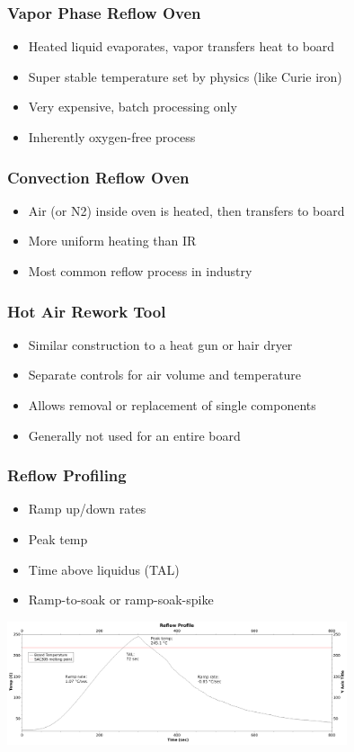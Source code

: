 \documentclass{beamer}
\begin{document}
\begin{frame}
\frametitle{Vapor Phase Reflow Oven}
\begin{itemize}
\item Heated liquid evaporates, vapor transfers heat to board
\item Super stable temperature set by physics (like Curie iron)
\item Very expensive, batch processing only
\item Inherently oxygen-free process
\end{itemize}
\end{frame}

\begin{frame}
\frametitle{Convection Reflow Oven}
\begin{itemize}
\item Air (or N2) inside oven is heated, then transfers to board
\item More uniform heating than IR
\item Most common reflow process in industry
\end{itemize}
\end{frame}

\begin{frame}
\frametitle{Hot Air Rework Tool}
\begin{itemize}
\item Similar construction to a heat gun or hair dryer
\item Separate controls for air volume and temperature
\item Allows removal or replacement of single components
\item Generally not used for an entire board
\end{itemize}
\end{frame}

\begin{frame}
\frametitle{Reflow Profiling}
\begin{itemize}
\item Ramp up/down rates
\item Peak temp
\item Time above liquidus (TAL)
\item Ramp-to-soak or ramp-soak-spike
\end{itemize}
\begin{center}
\includegraphics[width=10cm,keepaspectratio]{reflow-profile.png}
\end{center}
\end{frame}
\end{document}
